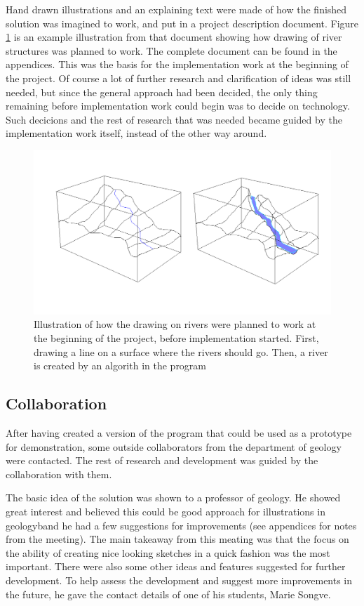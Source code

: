 \documentclass[a4paper,12pt]{report}
\begin{document}
Hand drawn illustrations and an explaining text were made of how the finished solution was imagined to work, and put in a project description document. Figure \ref{fig:riverDesription} is an example illustration from that document showing how drawing of river structures was planned to work. The complete document can be found in the appendices. This was the basis for the implementation work at the beginning of the project. Of course a lot of further research and clarification of ideas was still needed, but since the general approach had been decided, the only thing remaining before implementation work could begin was to decide on technology. Such decicions  and the rest of research that was needed became guided by the implementation work itself, instead of the other way around. 

\begin{figure}
 \includegraphics[width=\linewidth]{thesis/river.png}
 \caption{Illustration of how the drawing on rivers were planned to work at the beginning of the project, before implementation started. First, drawing a line on a surface where the rivers should go. Then, a river is created by an algorith in the program}
 \label{fig:riverDesription}
\end{figure}


\subsection{Collaboration}
After having created a version of the program that could be used as a prototype for demonstration, some outside collaborators from the department of geology were contacted. The rest of research and development was guided by the collaboration with them. 

The basic idea of the solution was shown to a professor of geology. He showed great interest and believed this could be good approach for illustrations in geologyband he had a few suggestions for improvements (see appendices for notes from the meeting). The main takeaway from this meating was that the focus on the ability of creating nice looking sketches in a quick fashion was the most important. There were also some other ideas and features suggested for further development. To help assess the development and suggest more improvements in the future, he gave the contact details of one of his students, Marie Songve.
\end{document}
